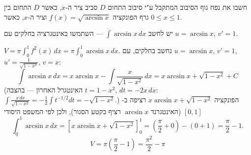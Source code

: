 
\begin{question}
חשבו את נפח גוף הסיבוב המתקבל ע"י סיבוב התחום $D$ סביב ציר ה-$x$, כאשר $D$ התחום בין גרף הפונקציה $f(x)=\sqrt{\arcsin x}$ וציר ה-$x$, כאשר $0\le x\le1$.
\end{question}

\begin{hint}
יש לחשב $\int\arcsin x\,dx$ — השתמשו באינטגרציה בחלקים עם $u=\arcsin x$, $v'=1$.
\end{hint}

\begin{solution}
$V=\pi\int_0^1f^2(x)\,dx=\pi\int_0^1\arcsin x\,dx$. נחשב בחלקים, עם $u=\arcsin x$, $v'=1$, $u'=\frac{1}{\sqrt{1-x^2}}$, $v=x$:
\[ \int\arcsin x\,dx=x\arcsin x-\int\frac{x}{\sqrt{1-x^2}}\,dx=x\arcsin x+\sqrt{1-x^2}+C \]
(האינטגרל האחרון — בהצבה $t=1-x^2$, $dt=-2x\,dx$: $\int\frac{x\,dx}{\sqrt{1-x^2}}=-\frac12\int t^{-1/2}dt=-\sqrt{1-x^2}$.) הפונקציה $x\arcsin x+\sqrt{1-x^2}$ רציפה ב-$[0,1]$ (האינטגרנד $\arcsin x$ רציף בקטע הסגור), ולכן לפי המשפט היסודי
\[ \int_0^1\arcsin x\,dx=\left[x\arcsin x+\sqrt{1-x^2}\right]_0^1=\left(\frac\pi2+0\right)-(0+1)=\frac\pi2-1. \]
\[ \boxed{V=\pi\left(\frac\pi2-1\right)=\frac{\pi^2}{2}-\pi} \]
\end{solution}
